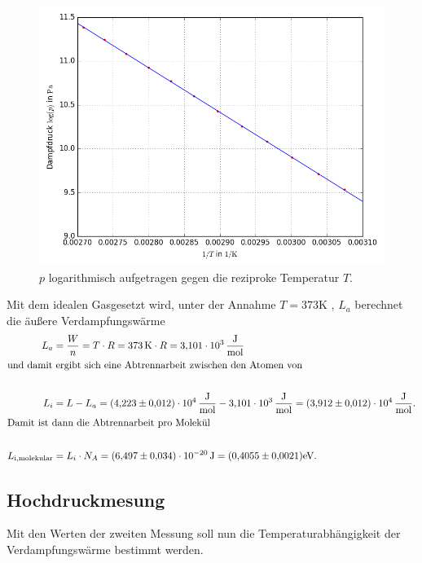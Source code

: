 \begin{figure}
  \centering
  \includegraphics[width=\textwidth]{gerade.png}
  \caption{$p$ logarithmisch aufgetragen gegen die reziproke Temperatur $T$.}
  \label{fig:1}
\end{figure}

Mit dem idealen Gasgesetzt wird, unter der Annahme $T = \num{373}\si{\kelvin}$ , $L_a$ berechnet die äußere Verdampfungswärme
\begin{align*}
  L_a &= \frac{W}{n} = T\cdot R = \SI{373}{\kelvin}\cdot R = \SI{3,101e3}{\joule\per\mole}\\
  \intertext{und damit ergibt sich eine Abtrennarbeit zwischen den Atomen von}\\
  L_i &= L - L_a = \SI{4,223(12)e4}{\joule\per\mol} - \SI{3,101e3}{\joule\per\mole} =  \SI{3,912(12)e4}{\joule\per\mole}.\\
  \intertext{Damit ist dann die Abtrennarbeit pro Molekül }\\
  L_\text{i,molekular} &= L_i \cdot N_A = \SI{6,497(34)e-20}{\joule} = (\num{0,4055(21)})\mathrm{eV}.\\
\end{align*}

\subsection{Hochdruckmesung}
\label{sub:Hochdruckmesung}

Mit den Werten der zweiten Messung soll nun die Temperaturabhängigkeit der Verdampfungswärme bestimmt werden.

